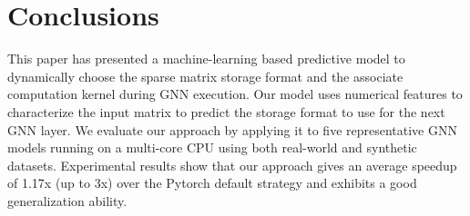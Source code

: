 \vspace{-7mm}
\section{Conclusions}
\vspace{-4mm} This paper has presented a machine-learning based predictive model to dynamically choose the sparse matrix storage format and
the associate computation kernel during GNN execution. Our model uses numerical features to characterize the input matrix to predict
the storage format to use for the next GNN layer. We evaluate our approach by applying it to five representative GNN models
running on a multi-core CPU using both real-world and synthetic datasets. Experimental results show that our approach gives an average
speedup of 1.17x (up to 3x) over the Pytorch default strategy and exhibits a good generalization ability.
